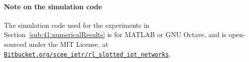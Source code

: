 \paragraph{Note on the simulation code}
%
The simulation code used for the experiments in Section~\ref{sub:41:numericalResults} is for MATLAB or GNU Octave,
and is open-sourced under the MIT License, at\\
\href{https://Bitbucket.org/scee_ietr/rl_slotted_iot_networks}{\texttt{Bitbucket.org/scee\_ietr/rl\_slotted\_iot\_networks}}.



